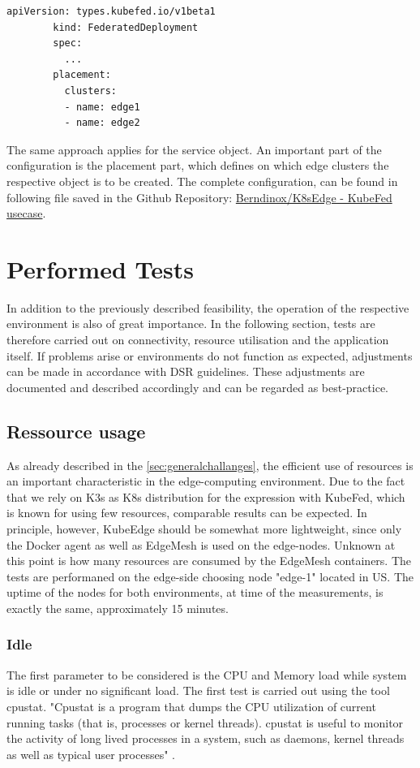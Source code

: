 \documentclass[MSC,Master,english]{twbook}%
\begin{document}
\begin{enumerate}
    \begin{lstlisting}[float,caption={Federated Object},captionpos=b]
        apiVersion: types.kubefed.io/v1beta1
        kind: FederatedDeployment
        spec:
          ...
        placement:
          clusters:
          - name: edge1
          - name: edge2
    \end{lstlisting}
    The same approach applies for the service object. An important part of the configuration is the placement part, which defines on which edge clusters the respective object is to be created. The complete configuration, can be found in following file saved in the Github Repository: \hyperref{https://github.com/Berndinox/K8sEdge/blob/main/DOCs/kubefed-usecase1.md}{}{}{Berndinox/K8sEdge - KubeFed usecase}\cite{bk-gh-usecase}.
\end{enumerate}

\section{Performed Tests}
\label{sec:dsrtest}
In addition to the previously described feasibility, the operation of the respective environment is also of great importance. In the following section, tests are therefore carried out on connectivity, resource utilisation and the application itself. If problems arise or environments do not function as expected, adjustments can be made in accordance with DSR guidelines. These adjustments are documented and described accordingly and can be regarded as best-practice.
\subsection{Ressource usage}
\label{sec:dsrtestress}
As already described in the \autoref{sec:generalchallanges}, the efficient use of resources is an important characteristic in the edge-computing environment. Due to the fact that we rely on K3s as \ac{K8s} distribution for the expression with KubeFed, which is known for using few resources, comparable results can be expected. In principle, however, KubeEdge should be somewhat more lightweight, since only the Docker agent as well as EdgeMesh is used on the edge-nodes. Unknown at this point is how many resources are consumed by the EdgeMesh containers. The tests are performaned on the edge-side choosing node "edge-1" located in US. The uptime of the nodes for both environments, at time of the measurements, is exactly the same, approximately 15 minutes.

\subsubsection{Idle}
The first parameter to be considered is the CPU and Memory load while system is idle or under no significant load. The first test is carried out using the tool cpustat. "Cpustat is a program that dumps the CPU utilization of current running tasks (that is, processes or kernel threads). cpustat is useful to monitor the activity of long lived processes in a system, such as daemons, kernel threads as well as typical user processes" \cite{cpustat}. \medbreak
\end{document}
